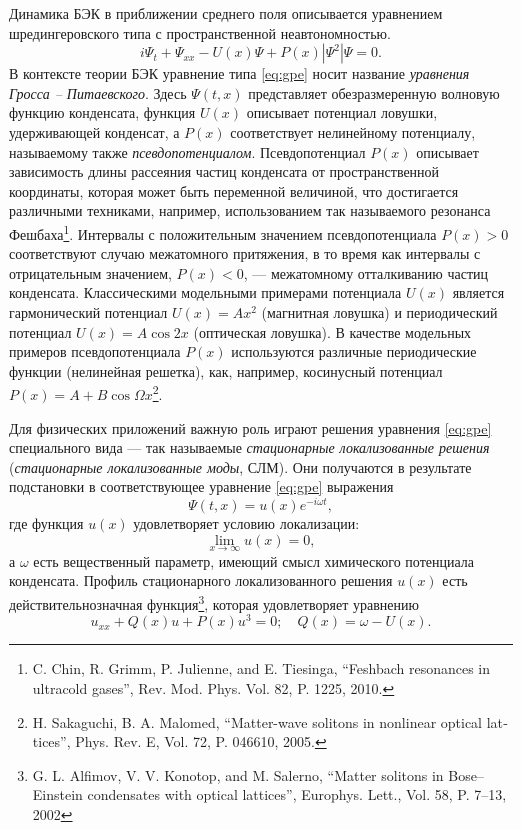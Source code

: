 \documentclass[candidate, href, colorlinks]{disser}
\begin{document}
Динамика БЭК в приближении среднего поля описывается уравнением шредингеровского типа с пространственной неавтономностью.
\begin{equation}
	i \Psi_t + \Psi_{xx} - U(x) \Psi + P(x) |\Psi^2| \Psi = 0.
\label{eq:gpe}
\end{equation}
В контексте теории БЭК уравнение типа \eqref{eq:gpe} носит название {\it уравнения Гросса -- Питаевского}.
Здесь $\Psi(t, x)$ представляет обезразмеренную волновую функцию конденсата, функция $U(x)$ описывает потенциал ловушки, удерживающей конденсат, а $P(x)$ соответствует нелинейному потенциалу, называемому также {\it псевдопотенциалом}.
Псевдопотенциал $P(x)$ описывает зависимость длины рассеяния частиц конденсата от пространственной координаты, которая может быть переменной величиной, что достигается различными техниками, например, использованием так называемого резонанса Фешбаха\footnote{C. Chin, R. Grimm, P. Julienne, and E. Tiesinga, ``Feshbach resonances in ultracold gases'', Rev. Mod. Phys. Vol. 82, P. 1225, 2010.}.
Интервалы с положительным значением псевдопотенциала $P(x) > 0$ соответствуют случаю межатомного притяжения, в то время как интервалы с отрицательным значением, $P(x) < 0$, ---  межатомному отталкиванию частиц конденсата.
Классическими модельными примерами потенциала $U(x)$ является гармонический потенциал $U(x) = Ax^2$ (магнитная ловушка) и периодический потенциал $U(x) = A \cos 2x$ (оптическая ловушка).
В качестве модельных примеров псевдопотенциала $P(x)$ используются различные периодические функции (нелинейная решетка), как, например, косинусный потенциал $P(x) = A + B \cos \Omega x$\footnote{\label{note:malomed} H. Sakaguchi,  B. A. Malomed, ``Matter-wave solitons in nonlinear optical lat­tices'', Phys. Rev. E, Vol. 72, P. 046610, 2005.}.

Для физических приложений важную роль играют решения уравнения \eqref{eq:gpe} специального вида --- так называемые {\it стационарные локализованные решения} ({\it стационарные локализованные моды}, СЛМ).
Они получаются в результате подстановки в соответствующее уравнение \eqref{eq:gpe} выражения
\begin{equation}
	\Psi(t, x) = u(x) e^{-i \omega t},
\label{eq:ansatz}
\end{equation}
где функция $u(x)$ удовлетворяет условию локализации:
\begin{equation}
	\lim \limits_{x \to \infty} u(x) = 0,
\label{eq:localization}
\end{equation}
а $\omega$ есть вещественный параметр, имеющий смысл химического потенциала конденсата.
Профиль стационарного локализованного решения $u(x)$ есть действительнозначная функция\footnote{G. L. Alfimov, V. V. Konotop, and M. Salerno, ``Matter solitons in Bose--Einstein condensates with optical lattices'', Europhys. Lett., Vol. 58, P. 7--13, 2002}, которая удовлетворяет уравнению
\begin{equation}
	u_{xx} + Q(x) u + P(x) u^3 = 0; \quad Q(x) = \omega - U(x).
\label{eq:stationary}
\end{equation}
\end{document}
